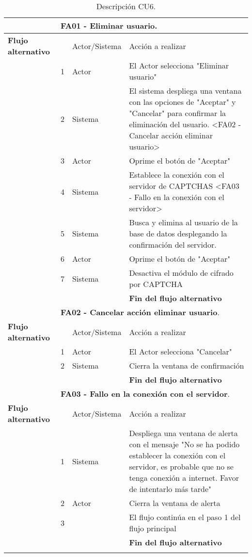 \documentclass[12pt,oneside,onecolumn,openany]{report}
\begin{document}
\begin{longtable}[H]{| p{} | p{} |p{4cm}|p{5cm}|}
     \hline
    & \multicolumn{3}{|l|}{\textbf{FA01 - Eliminar usuario}.}\\
    \hline
    \textbf{Flujo alternativo} & & Actor/Sistema & Acción a realizar\\
    \hline
    & 1 & Actor & El Actor selecciona "Eliminar usuario"\\
    \hline
    & 2 & Sistema & El sistema despliega una ventana con las opciones de "Aceptar" y "Cancelar" para confirmar la eliminación del usuario. <FA02 - Cancelar acción eliminar usuario>\\
    \hline
     & 3 & Actor & Oprime el botón de "Aceptar"\\
     \hline
     & 4 & Sistema & Establece la conexión con el servidor de CAPTCHAS <FA03 - Fallo en la conexión con el servidor>\\
     \hline
     & 5 & Sistema & Busca y elimina al usuario de la base de datos desplegando la confirmación del servidor.\\
     \hline
     & 6 & Actor & Oprime el botón de "Aceptar"\\
     \hline
     & 7 & Sistema & Desactiva el módulo de cifrado por CAPTCHA\\
     \hline
     &  & & \textbf{Fin del flujo alternativo}\\
     \hline
     & \multicolumn{3}{|l|}{\textbf{FA02 - Cancelar acción eliminar usuario}.}\\
    \hline
    \textbf{Flujo alternativo} & & Actor/Sistema & Acción a realizar\\
    \hline
    & 1 & Actor & El Actor selecciona "Cancelar"\\
    \hline
    & 2 & Sistema & Cierra la ventana de confirmación\\
    \hline
    &  & & \textbf{Fin del flujo alternativo}\\
     \hline
    & \multicolumn{3}{|l|}{\textbf{FA03 - Fallo en la conexión con el servidor}.}\\
    \hline
    \textbf{Flujo alternativo} & & Actor/Sistema & Acción a realizar\\
    \hline
    & 1 & Sistema & Despliega una ventana de alerta con el mensaje "No se ha podido establecer la conexión con el servidor, es probable que no se tenga conexión a internet. Favor de intentarlo más tarde"\\
    \hline
    & 2 & Actor & Cierra la ventana de alerta\\
    \hline
    & 3 &  & El flujo continúa en el paso 1 del flujo principal\\
    \hline
    &  & & \textbf{Fin del flujo alternativo}\\
    \caption{Descripción CU6.}
    \label{tabla:CU6}
\end{longtable}
\end{document}
